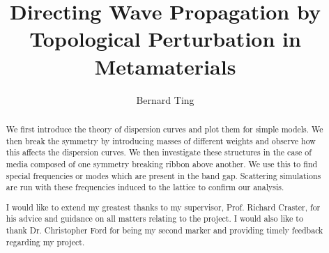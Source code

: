 \documentclass[a4paper, twoside]{report}
\title{Directing Wave Propagation by Topological Perturbation in Metamaterials}
\author{Bernard Ting}
\begin{document}


\begin{abstract}
We first introduce the theory of dispersion curves and plot them for simple
models. We then break the symmetry by introducing masses of different weights
and observe how this affects the dispersion curves. We then investigate these
structures in the case of media composed of one symmetry breaking ribbon above
another. We use this to find special frequencies or modes which are present in
the band gap. Scattering simulations are run with these frequencies induced to
the lattice to confirm our analysis.
\end{abstract}

\renewcommand{\abstractname}{Acknowledgements}
\begin{abstract}
I would like to extend my greatest thanks to my supervisor, Prof. Richard
Craster, for his advice and guidance on all matters relating to the project. I
would also like to thank Dr. Christopher Ford for being my second marker and
providing timely feedback regarding my project.
\end{abstract}

\tableofcontents












\end{document}
